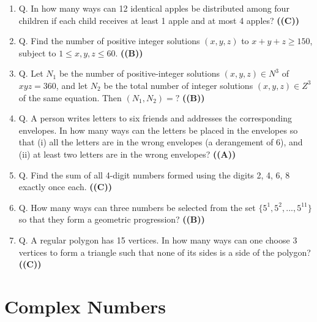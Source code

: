 \documentclass{article}
\begin{document}
\begin{enumerate}
\item Q. In how many ways can 12 identical apples be distributed among four children if each child receives at least 1 apple and at most 4 apples? \hfill \textbf{((C))}
\item Q. Find the number of positive integer solutions $(x, y, z)$ to $x+y+z \ge 150$, subject to $1 \le x, y, z \le 60$. \hfill \textbf{((B))}
\item Q. Let $N_1$ be the number of positive-integer solutions $(x, y, z) \in N^3$ of $xyz = 360$, and let $N_2$ be the total number of integer solutions $(x, y, z) \in Z^3$ of the same equation. Then $(N_1, N_2) =?$ \hfill \textbf{((B))}
\item Q. A person writes letters to six friends and addresses the corresponding envelopes. In how many ways can the letters be placed in the envelopes so that (i) all the letters are in the wrong envelopes (a derangement of 6), and (ii) at least two letters are in the wrong envelopes? \hfill \textbf{((A))}
\item Q. Find the sum of all 4-digit numbers formed using the digits 2, 4, 6, 8 exactly once each. \hfill \textbf{((C))}
\item Q. How many ways can three numbers be selected from the set $\{5^1, 5^2, ..., 5^{11}\}$ so that they form a geometric progression? \hfill \textbf{((B))}
\item Q. A regular polygon has 15 vertices. In how many ways can one choose 3 vertices to form a triangle such that none of its sides is a side of the polygon? \hfill \textbf{((C))}
\end{enumerate}
\section{Complex Numbers}
\end{document}
